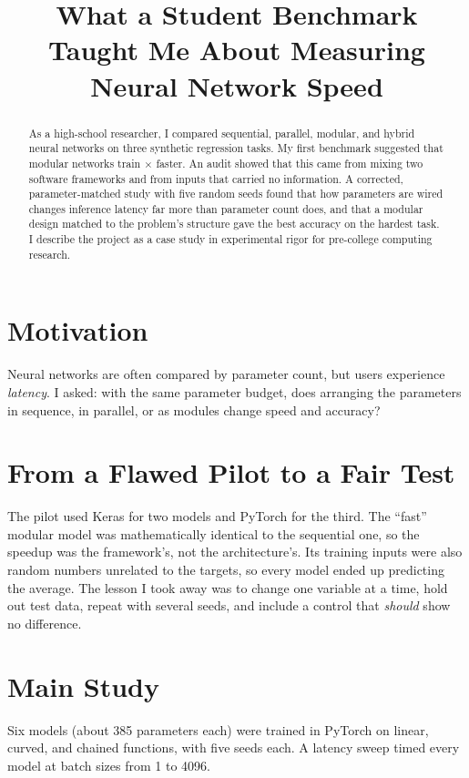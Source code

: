 \documentclass[conference]{IEEEtran}
\begin{document}
\title{What a Student Benchmark Taught Me About Measuring Neural Network Speed}
\author{
}
\maketitle

\begin{abstract}
As a high-school researcher, I compared sequential, parallel, modular, and hybrid neural networks on three
synthetic regression tasks. My first benchmark suggested that modular networks train
\pilotSpeedup$\times$ faster. An audit showed that this came from mixing two software frameworks and from
inputs that carried no information. A corrected, parameter-matched study with five random seeds found that how
parameters are wired changes inference latency far more than parameter count does, and that a modular
design matched to the problem's structure gave the best accuracy on the hardest task. I describe the project as
a case study in experimental rigor for pre-college computing research.
\end{abstract}

\section{Motivation}
Neural networks are often compared by parameter count, but users experience \emph{latency}. I asked:
with the same parameter budget, does arranging the parameters in sequence, in parallel, or as modules
change speed and accuracy?

\section{From a Flawed Pilot to a Fair Test}
The pilot used Keras for two models and PyTorch for the third. The ``fast'' modular model was mathematically
identical to the sequential one, so the speedup was the framework's, not the architecture's. Its training inputs
were also random numbers unrelated to the targets, so every model ended up predicting the average. The lesson
I took away was to change one variable at a time, hold out test data, repeat with several seeds, and include a
control that \emph{should} show no difference.

\section{Main Study}
Six models (about 385 parameters each) were trained in PyTorch on linear, curved, and chained functions,
with five seeds each. A latency sweep timed every model at batch sizes from 1 to 4096.
\end{document}
